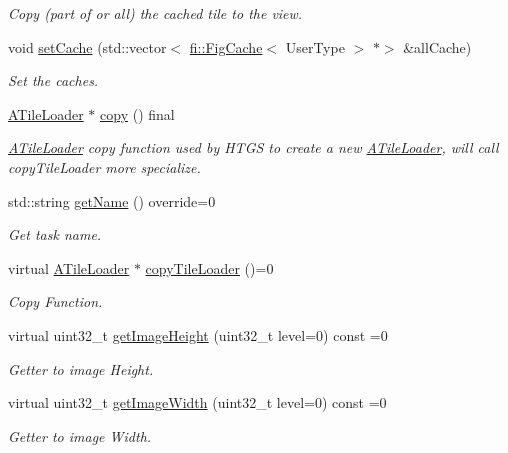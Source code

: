 \begin{DoxyCompactItemize}
\begin{DoxyCompactList}\small\item\em Copy (part of or all) the cached tile to the view. \end{DoxyCompactList}\item 
void \hyperlink{classfi_1_1ATileLoader_a1113a06fc88a278bede14bbee2ae4a59}{set\+Cache} (std\+::vector$<$ \hyperlink{classfi_1_1FigCache}{fi\+::\+Fig\+Cache}$<$ User\+Type $>$ $\ast$$>$ \&all\+Cache)
\begin{DoxyCompactList}\small\item\em Set the caches. \end{DoxyCompactList}\item 
\hyperlink{classfi_1_1ATileLoader}{A\+Tile\+Loader} $\ast$ \hyperlink{classfi_1_1ATileLoader_a6f842aefc3db84a1c95edaa9f550c1e7}{copy} () final
\begin{DoxyCompactList}\small\item\em \hyperlink{classfi_1_1ATileLoader}{A\+Tile\+Loader} copy function used by H\+T\+GS to create a new \hyperlink{classfi_1_1ATileLoader}{A\+Tile\+Loader}, will call copy\+Tile\+Loader more specialize. \end{DoxyCompactList}\item 
std\+::string \hyperlink{classfi_1_1ATileLoader_abb4cad235d57fbfb29ff5d37caf32a62}{get\+Name} () override=0
\begin{DoxyCompactList}\small\item\em Get task name. \end{DoxyCompactList}\item 
virtual \hyperlink{classfi_1_1ATileLoader}{A\+Tile\+Loader} $\ast$ \hyperlink{classfi_1_1ATileLoader_a99bd30a8283474c5bf667054a83a008d}{copy\+Tile\+Loader} ()=0
\begin{DoxyCompactList}\small\item\em Copy Function. \end{DoxyCompactList}\item 
virtual uint32\+\_\+t \hyperlink{classfi_1_1ATileLoader_a53fb257d3ec8f3fa3d5f6c58de859000}{get\+Image\+Height} (uint32\+\_\+t level=0) const =0
\begin{DoxyCompactList}\small\item\em Getter to image Height. \end{DoxyCompactList}\item 
virtual uint32\+\_\+t \hyperlink{classfi_1_1ATileLoader_ad775bcbdddf7da6bb3f857a53c075a86}{get\+Image\+Width} (uint32\+\_\+t level=0) const =0
\begin{DoxyCompactList}\small\item\em Getter to image Width. \end{DoxyCompactList}\item 
$$
\end{DoxyCompactItemize}
